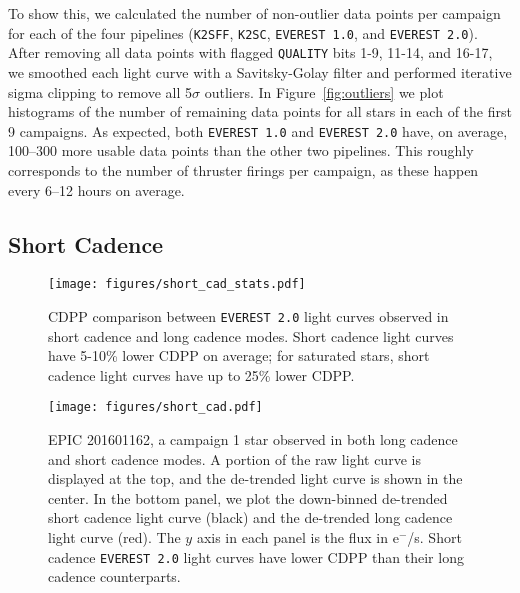\documentclass[]{aastex62}
\begin{document}
To show this, we calculated the number of non-outlier data points per campaign
for each of the four pipelines (\texttt{K2SFF}, \texttt{K2SC}, \texttt{EVEREST 1.0}, and
\texttt{EVEREST 2.0}). After removing all data points with flagged \texttt{QUALITY}
bits 1-9, 11-14, and 16-17, we smoothed each light curve with a Savitsky-Golay filter and
performed iterative sigma clipping to remove all 5$\sigma$ outliers. In Figure~\ref{fig:outliers}
we plot histograms of the number of remaining data points for all stars in each of the first
9 campaigns. As expected, both \texttt{EVEREST 1.0} and \texttt{EVEREST 2.0} have, on
average, 100--300 more usable data points than the other two pipelines. This roughly
corresponds to the number of thruster firings per campaign, as these happen every 6--12
hours on average.

\subsection{Short Cadence}
\label{sec:shortcad}

\begin{figure}[hbt]
  \begin{center}
      \texttt{[image: figures/short\_cad\_stats.pdf]}
       \caption{CDPP comparison between \texttt{EVEREST 2.0} light curves
       observed in short cadence and long cadence modes. Short cadence
       light curves have 5-10\% lower CDPP on average; for saturated stars,
       short cadence light curves have up to 25\% lower CDPP.}
     \label{fig:short_cad_stats}
  \end{center}
\end{figure}

\begin{figure}[hbt]
  \begin{center}
      \texttt{[image: figures/short\_cad.pdf]}
       \caption{EPIC 201601162, a campaign 1 star observed in both long cadence and
       short cadence modes. A portion of the raw light curve is
       displayed at the top, and the de-trended light curve is shown in the center. In the bottom panel,
       we plot the down-binned de-trended short cadence light curve (black) and the
       de-trended long cadence light curve (red). The $y$ axis in each panel is the flux
       in e$^{-}$/s.
       Short cadence \texttt{EVEREST 2.0}
       light curves have lower CDPP than their long cadence counterparts.}
     \label{fig:short_cad}
  \end{center}
\end{figure}
\end{document}
